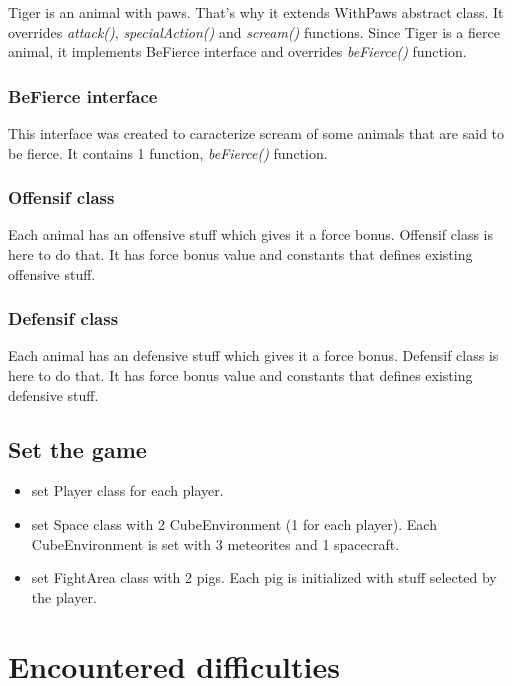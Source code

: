 Tiger is an animal with paws. That's why it extends WithPaws abstract class.
It overrides \textit{attack()}, \textit{specialAction()} and \textit{scream()} functions.
Since Tiger is a fierce animal, it implements BeFierce interface and overrides \textit{beFierce()} function.

\subsubsection{BeFierce interface}

This interface was created to caracterize scream of some animals that are said to be fierce.
It contains 1 function, \textit{beFierce()} function.

\subsubsection{Offensif class}

Each animal has an offensive stuff which gives it a force bonus. 
Offensif class is here to do that.
It has force bonus value and constants that defines existing offensive stuff.

\subsubsection{Defensif class}

Each animal has an defensive stuff which gives it a force bonus. 
Defensif class is here to do that.
It has force bonus value and constants that defines existing defensive stuff.


\subsection{Set the game}

\begin{itemize}
 \item set Player class for each player.
 \item set Space class with 2 CubeEnvironment (1 for each player). Each CubeEnvironment is set with 3 meteorites and 1 spacecraft.
 \item set FightArea class with 2 pigs. Each pig is initialized with stuff selected by the player.
\end{itemize}


\section{Encountered difficulties}

